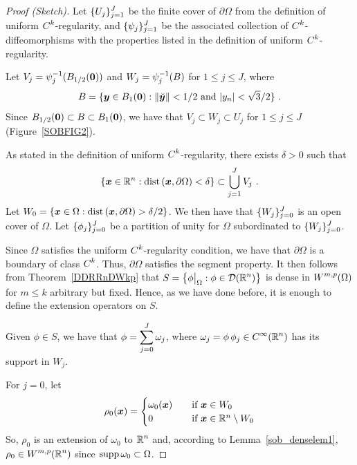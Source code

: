 
\begin{proof}[Proof (Sketch)]
Let $\displaystyle \{ U_j \}_{j=1}^J$ be the finite cover
of $\partial \Omega$ from the definition of uniform
$\displaystyle C^k$-regularity, and 
$\displaystyle \{ \psi_j \}_{j=1}^J$ be the associated
collection of $\displaystyle C^k$-diffeomorphisms with the properties
listed in the definition of uniform $\displaystyle C^k$-regularity. 

Let $\displaystyle V_j = \psi_j^{-1}(B_{1/2}({\bm{0}}))$
and $\displaystyle W_j = \psi_j^{-1}(B)$ for $1\leq j \leq J$, where
\[
B = \{ \VEC{y} \in B_1(\VEC{0}) :
\|\breve{\VEC{y}}\| < 1/2 \ \text{and}\ |y_n| < \sqrt{3}/2 \} \ .
\]
Since $B_{1/2}({\bm{0}}) \subset B \subset B_1({\bm{0}})$, we have that
$V_j \subset W_j \subset U_j$ for $1\leq j \leq J$ (Figure~\ref{SOBFIG2}).

As stated in the definition of uniform $\displaystyle C^k$-regularity,
there exists $\delta>0$ such that
\[
\left\{ {\bm{x}} \in \mathbb{R}^n :
\mathrm{dist}\left({\bm{x}},\partial \Omega\right)  < \delta \right\} \subset
\bigcup_{j=1}^J V_j \ .
\]
Let $\displaystyle W_0 = \left\{ {\bm{x}} \in \Omega :
\mathrm{dist}\left({\bm{x}},\partial \Omega\right)  > \delta/2 \right\}$.
We then have that $\displaystyle \{ W_j \}_{j=0}^J$ is an open cover
of $\Omega$.
Let $\displaystyle \{ \phi_j \}_{j=0}^J$ be a partition of unity for
$\Omega$ subordinated to $\displaystyle \{ W_j \}_{j=0}^J$.

Since $\Omega$ satisfies the uniform $\displaystyle C^k$-regularity
condition, we have that $\partial \Omega$ is a boundary of class
$\displaystyle C^k$.  Thus, $\partial \Omega$ satisfies the segment
property.  It then follows from Theorem~\ref{DDRRnDWkp} that
$\displaystyle S = \left\{ \phi\big|_{\Omega} : \phi \in \mathcal{D}(\mathbb{R}^n) \right\}$
is dense in $\displaystyle W^{m,p}(\Omega)$ for $m\leq k$ arbitrary
but fixed.  Hence, as we have done
before, it is enough to define the extension operators on $S$.  

Given $\phi \in S$, we have that
$\displaystyle \phi = \sum_{j=0}^J \omega_j$, where
$\displaystyle \omega_j = \phi\, \phi_j \in C^\infty(\mathbb{R}^n)$ has its
support in $W_j$.

For $j=0$, let
\[
\rho_0({\bm{x}})
= \begin{cases}
\omega_0({\bm{x}}) & \quad \text{if} \ {\bm{x}} \in W_0 \\
0 & \quad  \text{if} \ {\bm{x}} \in \mathbb{R}^n\setminus W_0
  \end{cases}
\]
So, $\rho_0$ is an extension of $\omega_0$ to $\displaystyle \mathbb{R}^n$ and,
according to Lemma~\ref{sob_denselem1},
$\displaystyle \rho_0 \in W^{m,p}(\mathbb{R}^n)$
since $\operatorname{supp} \omega_0 \subset \Omega$.


\end{proof}
